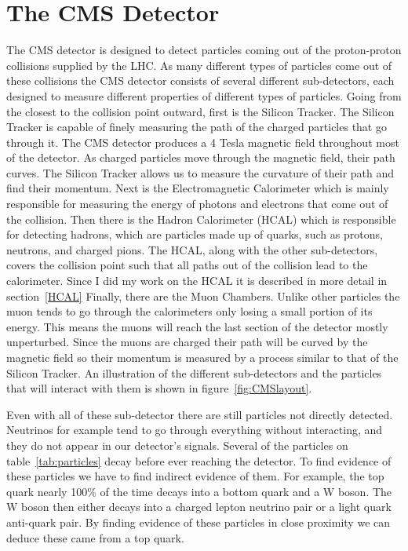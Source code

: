 \section{The CMS Detector}
The CMS detector is designed to detect particles coming out of the proton-proton collisions supplied by the LHC. As many different types of particles come out of these collisions the CMS detector consists of several different sub-detectors, each designed to measure different properties of different types of particles. Going from the closest to the collision point outward, first is the Silicon Tracker. The Silicon Tracker is capable of finely measuring the path of the charged particles that go through it. The CMS detector produces a 4 Tesla magnetic field throughout most of the detector. As charged particles move through the magnetic field, their path curves. The Silicon Tracker allows us to measure the curvature of their path and find their momentum. Next is the Electromagnetic Calorimeter which is mainly responsible for measuring the energy of photons and electrons that come out of the collision. Then there is the Hadron Calorimeter (HCAL) which is responsible for detecting hadrons, which are particles made up of quarks, such as protons, neutrons, and charged pions. The HCAL, along with the other sub-detectors, covers the collision point such that all paths out of the collision lead to the calorimeter. Since I did my work on the HCAL it is described in more detail in section~\ref{HCAL} Finally, there are the Muon Chambers. Unlike other particles the muon tends to go through the calorimeters only losing a small portion of its energy. This means the muons will reach the last section of the detector mostly unperturbed. Since the muons are charged their path will be curved by the magnetic field so their momentum is measured by a process similar to that of the Silicon Tracker. An illustration of the different sub-detectors and the particles that will interact with them is shown in figure~\ref{fig:CMSlayout}.

Even with all of these sub-detector there are still particles not directly detected. Neutrinos for example tend to go through everything without interacting, and they do not appear in our detector's signals. Several of the particles on table~\ref{tab:particles} decay before ever reaching the detector. To find evidence of these particles we have to find indirect evidence of them. For example, the top quark nearly 100\% of the time decays into a bottom quark and a W boson. The W boson then either decays into a charged lepton neutrino pair or a light quark anti-quark pair. By finding evidence of these particles in close proximity we can deduce these came from a top quark.

